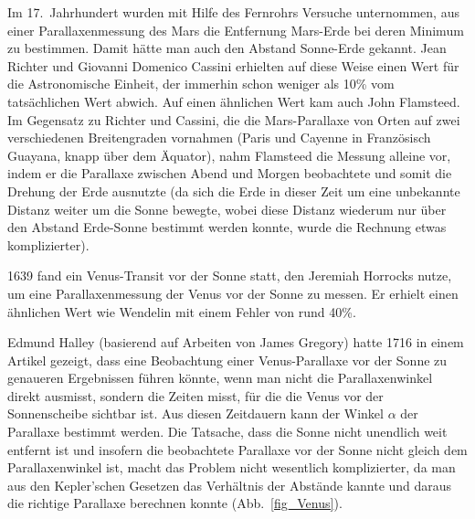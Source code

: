 Im 17.\ Jahrhundert wurden mit Hilfe des Fernrohrs Versuche unternommen, aus einer Parallaxenmessung 
des Mars die Entfernung Mars-Erde bei deren Minimum zu bestimmen. Damit h\"atte man auch
den Abstand Sonne-Erde gekannt. 
Jean Richter und Giovanni Domenico Cassini erhielten auf diese
Weise einen Wert f\"ur die Astronomische Einheit, der immerhin schon weniger als 10\% vom
tats\"achlichen Wert abwich. Auf einen \"ahnlichen Wert kam auch 
John Flamsteed. Im Gegensatz zu
Richter und Cassini, die die Mars-Parallaxe von Orten auf zwei verschiedenen Breitengraden
vornahmen (Paris und Cayenne in Franz\"osisch Guayana, knapp \"uber dem \"Aquator), nahm
Flamsteed die Messung alleine vor, indem er die Parallaxe zwischen Abend und Morgen beobachtete und
somit die Drehung der Erde ausnutzte (da sich die Erde in dieser Zeit um eine
unbekannte Distanz weiter um die Sonne bewegte, wobei diese Distanz wiederum nur \"uber
den Abstand Erde-Sonne bestimmt werden konnte, wurde die Rechnung etwas komplizierter). 

1639 fand ein Venus-Transit vor der Sonne statt, den Jeremiah Horrocks nutze, um eine
Parallaxenmessung der Venus vor der Sonne zu messen. Er erhielt einen \"ahnlichen Wert wie
Wendelin mit einem Fehler von rund 40\%. 

Edmund Halley 
(basierend auf Arbeiten von James Gregory) hatte 1716 in einem Artikel
gezeigt, dass eine Beobachtung einer Venus-Parallaxe vor der Sonne zu genaueren Ergebnissen
f\"uhren k\"onnte, wenn man nicht die Parallaxenwinkel direkt ausmisst, sondern die Zeiten misst,
f\"ur die die Venus vor der Sonnenscheibe sichtbar ist. Aus diesen Zeitdauern kann
der Winkel $\alpha$ der Parallaxe bestimmt werden. Die Tatsache, dass die Sonne nicht
unendlich weit entfernt ist und insofern die beobachtete Parallaxe vor der Sonne nicht gleich dem
Parallaxenwinkel ist, macht das Problem nicht wesentlich komplizierter, da man aus den
Kepler'schen Gesetzen das Verh\"altnis der Abst\"ande kannte und daraus die richtige Parallaxe
berechnen konnte (Abb.\ \ref{fig_Venus}). 

